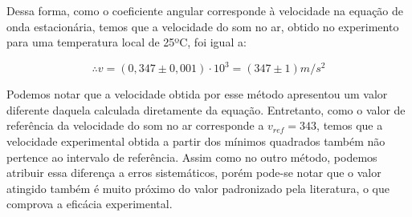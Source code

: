 Dessa forma, como o coeficiente angular corresponde à velocidade na equação de onda estacionária, temos que a velocidade do som no ar, obtido no experimento para uma temperatura local de 25ºC, foi igual a:

\[ \therefore v = (0,347 \pm 0,001) \cdot 10^3 = (347 \pm 1) m/s^2 \]

Podemos notar que a velocidade obtida por esse método apresentou um valor diferente daquela calculada diretamente da equação. Entretanto, como o valor de referência da velocidade do som no ar corresponde a $v_{ref} = 343$, temos que a velocidade experimental obtida a partir dos mínimos quadrados também não pertence ao intervalo de referência. Assim como no outro método, podemos atribuir essa diferença a erros sistemáticos, porém pode-se notar que o valor atingido também é muito próximo do valor padronizado pela literatura, o que comprova a eficácia experimental.
